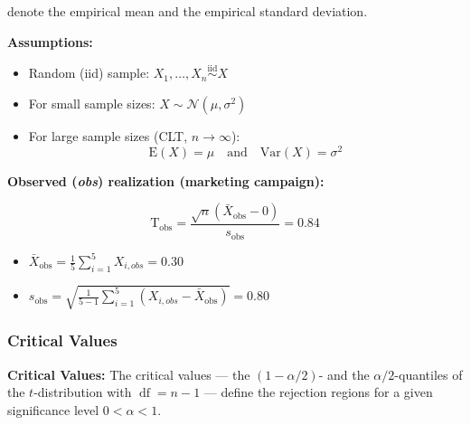 \documentclass[
  letterpaper,
  DIV=11,
  numbers=noendperiod]{scrreprt}
\providecommand{\tightlist}{%
  \setlength{\itemsep}{0pt}\setlength{\parskip}{0pt}}\usepackage{longtable,booktabs,array}
\begin{document}
denote the empirical mean and the empirical standard deviation.

\begin{tcolorbox}[enhanced jigsaw, opacityback=0, colback=white, colframe=quarto-callout-note-color-frame, breakable, rightrule=.15mm, arc=.35mm, left=2mm, bottomrule=.15mm, toprule=.15mm, leftrule=.75mm]

\textbf{Assumptions:}

\begin{itemize}
\item
  Random (iid) sample:
  \(X_1,\dots,X_n\overset{\operatorname{iid}}{\sim}X\)
\item
  For small sample sizes: \(X\sim\mathcal{N}(\mu, \sigma^2)\)
\item
  For large sample sizes (CLT, \(n\to\infty\)): \[
  \mathrm{E}(X)=\mu\quad\text{and}\quad \mathrm{Var}(X)=\sigma^2
  \]
\end{itemize}

\end{tcolorbox}

\textbf{Observed (\emph{obs}) realization (marketing campaign):}

\[
\mathrm{T}_{\mathrm{obs}} = \frac{\sqrt{n}(\bar{X}_{\mathrm{obs}} - 0)}{s_{\mathrm{obs}}} = 0.84
\]

\begin{itemize}
\tightlist
\item
  \(\bar{X}_{\mathrm{obs}}=\frac{1}{5}\sum_{i=1}^5 X_{i,obs} = 0.30\)
\item
  \(s_{\mathrm{obs}} = \sqrt{\frac{1}{5-1}\sum_{i=1}^5(X_{i,obs}-\bar{X}_{\mathrm{obs}})} = 0.80\)
\end{itemize}

\subsubsection*{\texorpdfstring{\textbf{Critical Values
\(\phantom{\mathrm{p}}\)}}{Critical Values \textbackslash phantom\{\textbackslash mathrm\{p\}\}}}\label{critical-values-phantommathrmp}

\begin{tcolorbox}[enhanced jigsaw, opacityback=0, colback=white, colframe=quarto-callout-note-color-frame, breakable, rightrule=.15mm, arc=.35mm, left=2mm, bottomrule=.15mm, toprule=.15mm, leftrule=.75mm]

\textbf{Critical Values:} The critical values --- the \((1-\alpha/2)\)-
and the \(\alpha/2\)-quantiles of the \(t\)-distribution with
\(\operatorname{df}=n-1\) --- define the rejection regions for a given
significance level \(0<\alpha<1\).

\end{tcolorbox}
\end{document}
